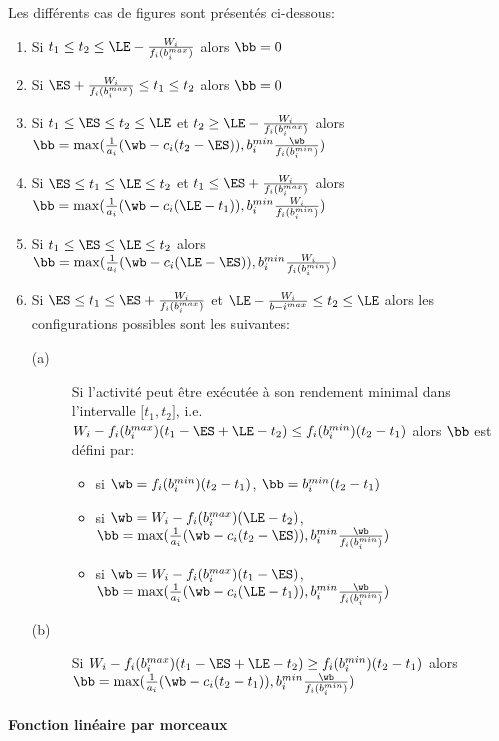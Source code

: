 Les différents cas de figures sont présentés ci-dessous:
\begin{enumerate}
\item Si $t_1 \le t_2 \le \LE - \frac{W_i}{f_i(b_i^{max})}$ alors $\bb=0$
\item Si $\ES+\frac{W_i}{f_i(b_i^{max})} \le t_1 \le t_2$ alors $\bb=0$
\item Si $t_1 \le \ES \le t_2 \le \LE$ et $t_2 \ge \LE - \frac{W_i}{f_i(b_i^{max})}$ alors $\bb=\max (\frac{1}{a_i}(\wb-c_i(t_2-\ES)),b_i^{min}\frac{\wb}{f_i(b_i^{min})})$
\item Si $\ES \le t_1 \le \LE \le t_2$ et $t_1 \le \ES+ \frac{W_i}{f_i(b_i^{max})}$ alors $\bb= \max (\frac{1}{a_i} (\wb-c_i(\LE-t_1)),b_i^{min}\frac{W_i}{f_i(b_i^{min})})$
\item Si $t_1 \le \ES \le \LE \le t_2$ alors $\bb= \max (\frac{1}{a_i} (\wb-c_i(\LE-\ES)),b_i^{min}\frac{W_i}{f_i(b_i^{min})})$
\item Si $\ES \le t_1 \le \ES + \frac{W_i}{f_i(b_i^{max})}$ et $\LE-\frac{W_i}{b-i^{max}} \le t_2 \le \LE$ alors les configurations possibles sont les suivantes:
	
  \begin{description}
  \item[(a)] Si l'activité peut être exécutée à son rendement minimal dans l'intervalle ${[}t_1,t_2{]}$, i.e. $W_i -f_i(b_i^{max})(t_1-\ES+\LE-t_2) \le f_i(b_i^{min})(t_2-t_1)$ alors $\bb$ est défini par:
    
    \begin{itemize}
    \item si $\wb=f_i(b_i^{min})(t_2-t_1)$, $\bb=b_i^{min}(t_2-t_1)$
    \item si $\wb=W_i - f_i(b_i^{max})(\LE-t_2)$, $\bb=\max (\frac{1}{a_i} (\wb-c_i(t_2-\ES)),b_i^{min}\frac{\wb}{f_i(b_i^{min})})$
    \item si $\wb=W_i - f_i(b_i^{max})(t_1-\ES)$, $\bb=\max (\frac{1}{a_i} (\wb-c_i(\LE-t_1)),b_i^{min}\frac{\wb}{f_i(b_i^{min})})$
    \end{itemize}
		
  \item[(b)] Si $W_i -f_i(b_i^{max})(t_1-\ES+\LE-t_2) \ge f_i(b_i^{min})(t_2-t_1)$ alors $\bb= \max (\frac{1}{a_i} (\wb-c_i(t_2-t_1)),b_i^{min}\frac{\wb}{f_i(b_i^{min})})$
  \end{description}
\end{enumerate}
	
	
\paragraph{Fonction linéaire par morceaux}
	
